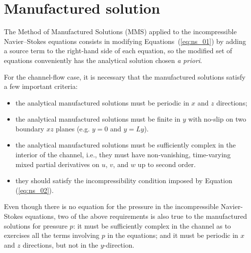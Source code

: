 \documentclass[10pt]{article}
\begin{document}
\section{Manufactured solution}

The Method of Manufactured Solutions (MMS) applied to the incompressible Navier--Stokes equations consists in modifying Equations~(\ref{eq:ns_01}) by adding a source term to the right-hand side of each equation, so the modified set of equations conveniently has the analytical solution chosen \textit{a priori}.

For the channel-flow case, it is necessary that the manufactured solutions satisfy a few important criteria:
\begin{itemize}
\item the analytical manufactured solutions must be periodic in $x$ and $z$ directions;
\item the analytical manufactured solutions must be finite in $y$ with no-slip on two boundary $xz$ planes (e.g. $y=0$ and $y=Ly$).
\item the analytical manufactured solutions must be sufficiently complex in the interior of the channel, i.e., they must have non-vanishing, time-varying mixed partial derivatives on $u$, $v$, and $w$ up to second order.
\item they should satisfy the incompressibility condition imposed by Equation (\ref{eq:ns_02}).
\end{itemize}

Even though there is no equation for the pressure in the incompressible Navier-Stokes equations, two of the above requirements is also true to the manufactured solutions for pressure $p$: it must be sufficiently complex in the channel as to exercises all the terms involving $p$ in the equations; and it must be periodic in $x$ and $z$ directions, but not in the $y$-direction. 


\end{document}
